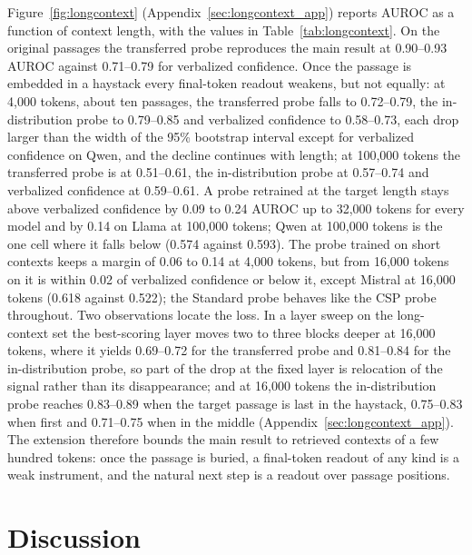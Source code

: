 \documentclass[acmsmall,screen,review]{acmart}
\begin{document}
Figure~\ref{fig:longcontext} (Appendix~\ref{sec:longcontext_app}) reports AUROC as a function of context length, with the values in Table~\ref{tab:longcontext}. On the original passages the transferred probe reproduces the main result at 0.90--0.93 AUROC against 0.71--0.79 for verbalized confidence. Once the passage is embedded in a haystack every final-token readout weakens, but not equally: at 4,000 tokens, about ten passages, the transferred probe falls to 0.72--0.79, the in-distribution probe to 0.79--0.85 and verbalized confidence to 0.58--0.73, each drop larger than the width of the 95\% bootstrap interval except for verbalized confidence on Qwen, and the decline continues with length; at 100,000 tokens the transferred probe is at 0.51--0.61, the in-distribution probe at 0.57--0.74 and verbalized confidence at 0.59--0.61. A probe retrained at the target length stays above verbalized confidence by 0.09 to 0.24 AUROC up to 32,000 tokens for every model and by 0.14 on Llama at 100,000 tokens; Qwen at 100,000 tokens is the one cell where it falls below (0.574 against 0.593). The probe trained on short contexts keeps a margin of 0.06 to 0.14 at 4,000 tokens, but from 16,000 tokens on it is within 0.02 of verbalized confidence or below it, except Mistral at 16,000 tokens (0.618 against 0.522); the Standard probe behaves like the CSP probe throughout. Two observations locate the loss. In a layer sweep on the long-context set the best-scoring layer moves two to three blocks deeper at 16,000 tokens, where it yields 0.69--0.72 for the transferred probe and 0.81--0.84 for the in-distribution probe, so part of the drop at the fixed layer is relocation of the signal rather than its disappearance; and at 16,000 tokens the in-distribution probe reaches 0.83--0.89 when the target passage is last in the haystack, 0.75--0.83 when first and 0.71--0.75 when in the middle (Appendix~\ref{sec:longcontext_app}). The extension therefore bounds the main result to retrieved contexts of a few hundred tokens: once the passage is buried, a final-token readout of any kind is a weak instrument, and the natural next step is a readout over passage positions.

\section{Discussion}
\label{sec:discussion}
\end{document}
